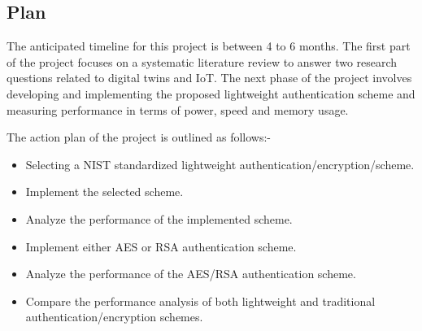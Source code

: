 \subsection{Plan}
The anticipated timeline for this project is between 4 to 6 months. The first part of the project focuses on a systematic literature review to answer two research questions related to digital twins and IoT.  The next phase of the project involves developing and implementing the proposed lightweight authentication scheme and measuring performance in terms of power, speed and memory usage.

The action plan of the project is outlined as follows:-
\begin{itemize}
    \item Selecting a NIST standardized lightweight authentication/encryption/scheme. 
    \item Implement the selected scheme. 
    \item Analyze the performance of the implemented scheme. 
    \item Implement either AES or RSA authentication scheme. 
    \item Analyze the performance of the AES/RSA authentication scheme.
    \item Compare the performance analysis of both lightweight and traditional authentication/encryption schemes.
\end{itemize}
